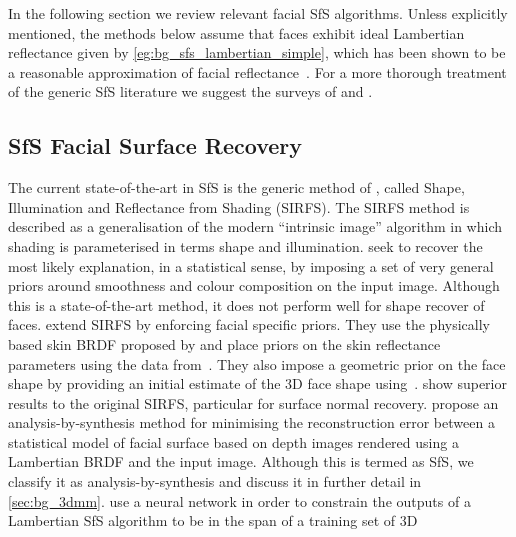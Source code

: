 In the following section we review relevant facial SfS algorithms. Unless
explicitly mentioned, the methods below assume that faces exhibit ideal
Lambertian reflectance given by \cref{eg:bg_sfs_lambertian_simple},
which has been shown to be a reasonable approximation
of facial reflectance~\cite{Sirovich:1987te,georghiades2001fromfew,%
Basri:2003ie,turk1991eigenfaces,Hallinan:1994dz,ramamoorthi2002analytic,%
ramamoorthi2001relationship,shashua1997photometric,moses1993face,%
marschner1999image}. For a more
thorough treatment of the generic SfS literature we suggest the surveys
of \citet{zhang1999shape} and \citet{durou2008numerical}.
\subsection{SfS Facial Surface Recovery}
The current state-of-the-art in SfS is the generic method of
\citet{barron2015shape}, called
Shape, Illumination and Reflectance from Shading (SIRFS). The SIRFS method is
described as a generalisation of the modern ``intrinsic image'' algorithm in
which shading is parameterised in terms shape and illumination.
\citet{barron2015shape} seek to recover the most likely explanation, in a
statistical sense, by imposing a set of very general priors around smoothness
and colour composition on the input image. Although this is a state-of-the-art
method, it does not perform well for shape recover of faces.
\citet{li2014intrinsic} extend SIRFS by enforcing facial specific priors. They
use the physically based skin BRDF proposed by \citet{weyrich2006analysis} and
place priors on the skin reflectance parameters using the data
from~\cite{weyrich2006analysis}. They also impose a geometric prior on the face
shape by providing an initial estimate of the 3D face shape
using~\cite{Yang:2011gj}. \citet{li2014intrinsic} show superior results to the
original SIRFS, particular for surface normal recovery.
\citet{atick1996statistical} propose an analysis-by-synthesis method
for minimising the reconstruction error between a statistical model of facial
surface based on depth images rendered using a Lambertian BRDF and the input
image. Although this is termed as SfS, we classify it as analysis-by-synthesis
and discuss it in further detail in \cref{sec:bg_3dmm}.
\citet{yuan2002sfs} use a neural network in order to constrain the outputs
of a Lambertian SfS algorithm to be in the span of a training set of 3D
